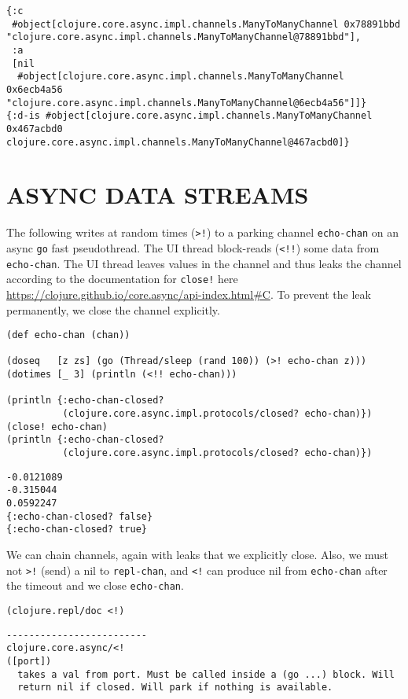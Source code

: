 \documentclass[10pt,oneside,x11names]{article}
\begin{document}
\begin{verbatim}
{:c
 #object[clojure.core.async.impl.channels.ManyToManyChannel 0x78891bbd "clojure.core.async.impl.channels.ManyToManyChannel@78891bbd"],
 :a
 [nil
  #object[clojure.core.async.impl.channels.ManyToManyChannel 0x6ecb4a56 "clojure.core.async.impl.channels.ManyToManyChannel@6ecb4a56"]]}
{:d-is #object[clojure.core.async.impl.channels.ManyToManyChannel 0x467acbd0 clojure.core.async.impl.channels.ManyToManyChannel@467acbd0]}
\end{verbatim}

\section{ASYNC DATA STREAMS}
\label{async-data-streams}
The following writes at random times (\texttt{>!}) to a parking channel
\texttt{echo-chan} on an async \texttt{go} fast pseudothread. The UI thread
block-reads (\texttt{<!!}) some data from \texttt{echo-chan}. The UI thread leaves
values in the channel and thus leaks the channel according to the
documentation for \texttt{close!} here
\url{https://clojure.github.io/core.async/api-index.html\#C}. To prevent the
leak permanently, we close the channel explicitly.

\begin{verbatim}
(def echo-chan (chan))

(doseq   [z zs] (go (Thread/sleep (rand 100)) (>! echo-chan z)))
(dotimes [_ 3] (println (<!! echo-chan)))

(println {:echo-chan-closed?
          (clojure.core.async.impl.protocols/closed? echo-chan)})
(close! echo-chan)
(println {:echo-chan-closed?
          (clojure.core.async.impl.protocols/closed? echo-chan)})
\end{verbatim}

\begin{verbatim}
-0.0121089
-0.315044
0.0592247
{:echo-chan-closed? false}
{:echo-chan-closed? true}
\end{verbatim}


We can chain channels, again with leaks that we explicitly close. Also, we must
not \texttt{>!} (send) a nil to \texttt{repl-chan}, and \texttt{<!} can produce nil from \texttt{echo-chan}
after the timeout and we close \texttt{echo-chan}.

\begin{verbatim}
(clojure.repl/doc <!)
\end{verbatim}

\begin{verbatim}
-------------------------
clojure.core.async/<!
([port])
  takes a val from port. Must be called inside a (go ...) block. Will
  return nil if closed. Will park if nothing is available.
\end{verbatim}
\end{document}

